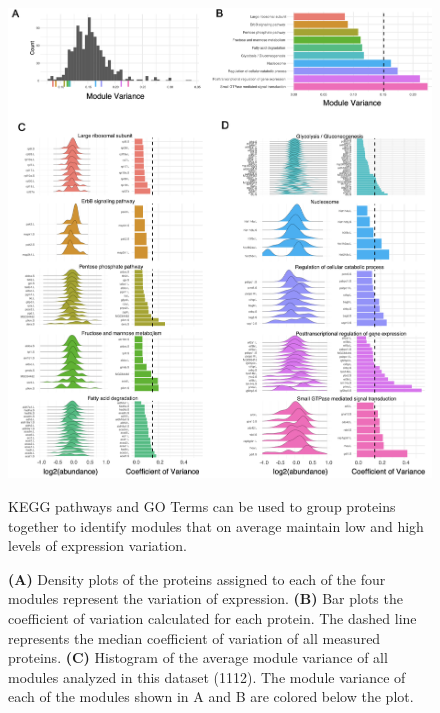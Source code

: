 \begin{figure}[hbt!]
\centering
\includegraphics[width=15cm, keepaspectratio]{figs/paper2/fig2.png}
\caption{KEGG pathways and GO Terms can be used to group proteins together to identify modules that on average maintain low and high levels of expression variation.}
\caption*{\textbf{(A)} Density plots of the proteins assigned to each of the four modules represent the variation of expression. \textbf{(B)} Bar plots the coefficient of variation calculated for each protein. The dashed line represents the median coefficient of variation of all measured proteins. \textbf{(C)} Histogram of the average module variance of all modules analyzed in this dataset (1112). The module variance of each of the modules shown in A and B are colored below the plot.}
\label{fig:paper2_fig2}
\end{figure}

